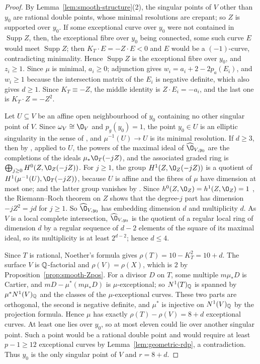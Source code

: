 \begin{proof}
By Lemma~\ref{lem:smooth-structure}(2), the singular points of $V$ other than $y_0$ are rational double points, whose minimal resolutions are crepant; so $Z$ is supported over $y_0$.
If some exceptional curve over $y_0$ were not contained in $\operatorname{Supp}Z$, then, the exceptional fibre over $y_0$ being connected, some such curve $E$ would meet $\operatorname{Supp}Z$; then $K_T\cdot E = -Z\cdot E<0$ and $E$ would be a $(-1)$-curve, contradicting minimality.
Hence $\operatorname{Supp}Z$ is the exceptional fibre over $y_0$, and $z_i\geq 1$.
Since $\mu$ is minimal, $a_i\geq 0$; adjunction gives $w_i = a_i+2-2p_a(E_i)$, and $w_i\geq 1$ because the intersection matrix of the $E_i$ is negative definite, which also gives $d\geq 1$.
Since $K_T\equiv -Z$, the middle identity is $Z\cdot E_i = -a_i$, and the last one is $K_T\cdot Z = -Z^2$.

Let $U\subseteq V$ be an affine open neighbourhood of $y_0$ containing no other singular point of $V$.
Since $\omega_V\cong\O_V$ and $p_g(y_0) = 1$, the point $y_0\in U$ is an elliptic singularity in the sense of \cite[Definition~5.1]{Tan25}, and $\mu^{-1}(U)\to U$ is its minimal resolution.
If $d\geq 3$, then by \cite[Lemma~5.2, Notation~5.15 and the proof of Theorem~5.19]{Tan25}, applied to $U$, the powers of the maximal ideal of $\widehat\O_{V,y_0}$ are the completions of the ideals $\mu_*\O_T(-jZ)$, and the associated graded ring is $\bigoplus_{j\geq 0}H^0(Z,\O_Z(-jZ))$.
For $j\geq 1$, the group $H^1(Z,\O_Z(-jZ))$ is a quotient of $H^1(\mu^{-1}(U),\O_T(-jZ))$, because $U$ is affine and the fibres of $\mu$ have dimension at most one; and the latter group vanishes by \cite[Notation~5.15]{Tan25}.
Since $h^0(Z,\O_Z) = h^1(Z,\O_Z) = 1$ \cite[Lemma~5.2]{Tan25}, the Riemann--Roch theorem on $Z$ shows that the degree-$j$ part has dimension $-jZ^2 = jd$ for $j\geq 1$.
So $\widehat\O_{V,y_0}$ has embedding dimension $d$ and multiplicity $d$.
As $V$ is a local complete intersection, $\widehat\O_{V,y_0}$ is the quotient of a regular local ring of dimension $d$ by a regular sequence of $d-2$ elements of the square of its maximal ideal, so its multiplicity is at least $2^{d-2}$; hence $d\leq 4$.

Since $T$ is rational, Noether's formula gives $\rho(T) = 10-K_T^2 = 10+d$.
The surface $V$ is $\mathbb{Q}$-factorial and $\rho(V) = \rho(X)$, which is $2$ by Proposition~\ref{prop:smooth-Zpos}.
For a divisor $D$ on $T$, some multiple $m\mu_*D$ is Cartier, and $mD-\mu^*(m\mu_*D)$ is $\mu$-exceptional; so $N^1(T)_{\mathbb{Q}}$ is spanned by $\mu^*N^1(V)_{\mathbb{Q}}$ and the classes of the $\mu$-exceptional curves.
These two parts are orthogonal, the second is negative definite, and $\mu^*$ is injective on $N^1(V)_{\mathbb{Q}}$ by the projection formula.
Hence $\mu$ has exactly $\rho(T)-\rho(V) = 8+d$ exceptional curves.
At least one lies over $y_0$, so at most eleven could lie over another singular point.
Such a point would be a rational double point and would require at least $p-1\geq 12$ exceptional curves by Lemma~\ref{lem:geometric-rdp}, a contradiction.
Thus $y_0$ is the only singular point of $V$ and $r = 8+d$.
\end{proof}

